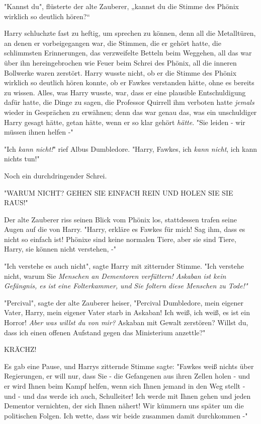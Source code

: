 {"Kannst du", flüsterte der alte Zauberer, „kannst du die Stimme des Phönix wirklich so deutlich hören?“

Harry schluchzte fast zu heftig, um sprechen zu können, denn all die Metalltüren, an denen er vorbeigegangen war, die Stimmen, die er gehört hatte, die schlimmsten Erinnerungen, das verzweifelte Betteln beim Weggehen, all das war über ihn hereingebrochen wie Feuer beim Schrei des Phönix, all die inneren Bollwerke waren zerstört. Harry wusste nicht, ob er die Stimme des Phönix wirklich so deutlich hören konnte, ob er Fawkes verstanden hätte, ohne es bereits zu wissen. Alles, was Harry wusste, war, dass er eine plausible Entschuldigung dafür hatte, die Dinge zu sagen, die Professor Quirrell ihm verboten hatte \emph{jemals} wieder in Gesprächen zu erwähnen; denn das war genau das, was ein unschuldiger Harry gesagt hätte, getan hätte, wenn er so klar gehört \emph{hätte}. "Sie leiden - wir müssen ihnen helfen -"

"Ich \emph{kann nicht!}" rief Albus Dumbledore. "Harry, Fawkes, ich \emph{kann nicht}, ich kann nichts tun!"

Noch ein durchdringender Schrei.

"WARUM NICHT? GEHEN SIE EINFACH REIN UND HOLEN SIE SIE RAUS!"

Der alte Zauberer riss seinen Blick vom Phönix los, stattdessen trafen seine Augen auf die von Harry. "Harry, erkläre es Fawkes für mich! Sag ihm, dass es nicht so einfach ist! Phönixe sind keine normalen Tiere, aber sie sind Tiere, Harry, sie können nicht verstehen, -"

"Ich verstehe es auch nicht", sagte Harry mit zitternder Stimme. "Ich verstehe nicht, warum Sie \emph{Menschen an Dementoren verfüttern! Askaban ist kein Gefängnis, es ist eine Folterkammer, und} \emph{Sie foltern diese Menschen zu Tode!"}

"Percival", sagte der alte Zauberer heiser, "Percival Dumbledore, mein eigener Vater, Harry, mein eigener Vater starb in Askaban! Ich weiß, ich weiß, es ist ein Horror! \emph{Aber was willst du von mir?} Askaban mit Gewalt zerstören? Willst du, dass ich einen offenen Aufstand gegen das Ministerium anzettle?"

KRÄCHZ!

Es gab eine Pause, und Harrys zitternde Stimme sagte: "Fawkes weiß nichts über Regierungen, er will nur, dass Sie - die Gefangenen aus ihren Zellen holen - und er wird Ihnen beim Kampf helfen, wenn sich Ihnen jemand in den Weg stellt - und - und das werde ich auch, Schulleiter! Ich werde mit Ihnen gehen und jeden Dementor vernichten, der sich Ihnen nähert! Wir kümmern uns später um die politischen Folgen. Ich wette, dass wir beide zusammen damit durchkommen -"

}
